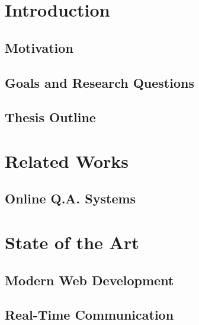 \documentclass[english, BCOR=6mm, twoside=true, open=right]{tudscrreprt}
\begin{document}

\maketitle

\confirmation[pagestyle=empty.tudheadings]
\cleardoublepage

\begin{abstract}[pagestyle=empty.tudheadings]

\end{abstract}

\tableofcontents


\chapter{Introduction}
\section{Motivation}

\section{Goals and Research Questions}

\section{Thesis Outline}



\chapter{Related Works}
\section{Online Q.A. Systems}
% 


\chapter{State of the Art}
\section{Modern Web Development}
\section{Real-Time Communication}
\end{document}
